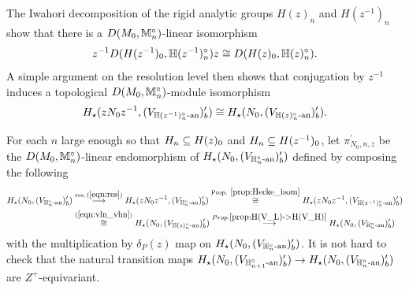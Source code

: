 \documentclass[10pt]{amsart}
\begin{document}
The Iwahori decomposition of the rigid analytic groups $H(z)_{n}$ and $H(z^{-1})_{n}$ show that there is a $D(M_{0},\mathbb{M}_{n}^{\circ})$-linear isomorphism \[
    z^{-1}D(H(z^{-1})_{0},\mathbb{H}(z^{-1})_{n}^{\circ})z \cong D(H(z)_{0},\mathbb{H}(z)_{n}^{\circ}).
\] A simple argument on the resolution level then shows that conjugation by $z^{-1}$ induces a topological $D(M_{0},\mathbb{M}_{n}^{\circ})$-module isomorphism \begin{equation}\label{eqn:vln_vhn}
    H_{\star}(zN_{0}z^{-1},(V_{\mathbb{H}(z^{-1})_{n}^{\circ}\textnormal{-an}})^{\prime}_{b}) \cong H_{\star}(N_{0},(V_{\mathbb{H}(z)_{n}^{\circ}\textnormal{-an}})^{\prime}_{b}). 
\end{equation} 

For each $n$ large enough so that $H_{n}\subseteq H(z)_{0}$ and $H_{n}\subseteq H(z^{-1})_{0}$, let $\pi_{N_{0},n,z}^{\prime}$ be the $D(M_{0},\mathbb{M}_{n}^{\circ})$-linear endomorphism of $H_{\star}(N_{0},(V_{\mathbb{H}_{n}^{\circ}\textnormal{-an}})^{\prime}_{b})$ defined by composing the following \begin{equation}\label{eqn:Hecke}\begin{split}
    H_{\star}(N_{0},(V_{\mathbb{H}_{n}^{\circ}\textnormal{-an}})^{\prime}_{b}) & \overset{\textnormal{res},\, (\ref{eqn:res})}{\longrightarrow} H_{\star}(zN_{0}z^{-1},(V_{\mathbb{H}_{n}^{\circ}\textnormal{-an}})^{\prime}_{b}) \overset{\textnormal{Prop. }\ref{prop:Hecke_isom}}{\cong} H_{\star}(zN_{0}z^{-1},(V_{\mathbb{H}(z^{-1})_{n}^{\circ}\textnormal{-an}})^{\prime}_{b}) \\
    & \overset{(\ref{eqn:vln_vhn})}{\cong}H_{\star}(N_{0},(V_{\mathbb{H}(z)_{n}^{\circ}\textnormal{-an}})^{\prime}_{b}) \overset{Prop. \ref{prop:H(V_L)->H(V_H)}} {\longrightarrow} H_{\star}(N_{0},(V_{\mathbb{H}_{n}^{\circ}\textnormal{-an}})^{\prime}_{b})
\end{split}\end{equation} with the multiplication by $\delta_{P}(z)$ map on $H_{\star}(N_{0},(V_{\mathbb{H}_{n}^{\circ}\textnormal{-an}})^{\prime}_{b})$. It is not hard to check that the natural transition maps $H_{\star}(N_{0},(V_{\mathbb{H}^{\circ}_{n+1}\textnormal{-an}})^{\prime}_{b})\rightarrow H_{\star}(N_{0},(V_{\mathbb{H}_{n}^{\circ}\textnormal{-an}})^{\prime}_{b})$ are $Z^{+}$-equivariant. 
\end{document}
